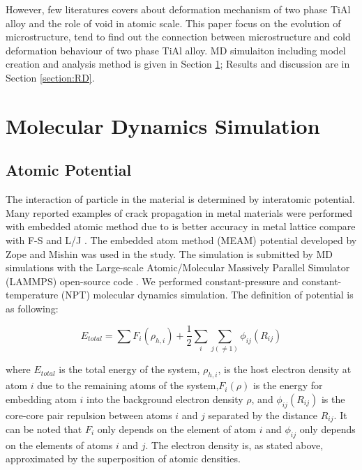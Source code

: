 \documentclass[metals,article,submit,moreauthors,pdftex,10pt,a4paper]{Definitions/mdpi}
\begin{document}
However, few literatures covers about deformation mechanism of two phase TiAl alloy and the role of void in atomic scale.
This paper focus on the evolution of microstructure, tend to find out the connection between microstructure and cold deformation behaviour of two phase TiAl alloy. MD simulaiton including model creation and analysis method is given in Section \ref{section:method}; Results and discussion are in Section \ref{section:RD}.

\section{Molecular Dynamics Simulation }\label{section:method}
\subsection{Atomic Potential}

The interaction of particle in the material is determined by interatomic potential. Many reported examples of crack propagation in metal materials were performed with embedded atomic method due to is better accuracy in metal lattice compare with F-S and L/J \cite{Ko2015}. The embedded atom method (MEAM) potential developed by Zope and Mishin \cite{Zope2003} was used in the study. The simulation is submitted by MD simulations with the Large-scale Atomic/Molecular Massively Parallel Simulator (LAMMPS) open-source code \cite{Plimpton1995}. We performed constant-pressure and constant-temperature (NPT) molecular dynamics simulation. The definition of potential is as following:
	
\begin{equation} \label{eq:eam} 
E_{total}= \displaystyle\sum F_i(\rho_{h,i})+\frac{1}{2}\sum_i\sum_{j(\neq1)}\phi_{ij}(R_{ij})
\end{equation}
	
where $E_{total}$ is the total energy of the system, $\rho_{h,i}$, is the host electron density at atom $i$ due to the remaining atoms of the system,$F_i(\rho)$ is the energy for embedding atom $i$ into the background electron density $\rho$, and $\phi_{ij}(R_{ij})$ is the core-core pair repulsion between atoms $i$ and $j$ separated by the distance $R_{ij}$. It can be noted that $F_i$ only depends on the element of atom $i$ and $\phi_{ij}$ only depends on the elements of atoms $i$ and $j$. The electron density is, as stated above, approximated by the superposition of atomic densities.
	
%	
\end{document}
